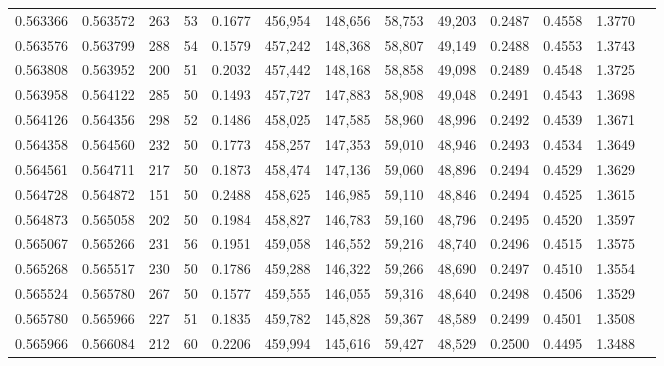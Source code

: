 \begin{tabular}{rrrrrrrrrrrrr}
0.563366 & 0.563572 &   263 &  53 &                                     0.1677 & 456,954 & 148,656 &  58,753 &  49,203 & 0.2487 & 0.4558 & 1.3770 \\
0.563576 & 0.563799 &   288 &  54 &                                     0.1579 & 457,242 & 148,368 &  58,807 &  49,149 & 0.2488 & 0.4553 & 1.3743 \\
0.563808 & 0.563952 &   200 &  51 &                                     0.2032 & 457,442 & 148,168 &  58,858 &  49,098 & 0.2489 & 0.4548 & 1.3725 \\
0.563958 & 0.564122 &   285 &  50 &                                     0.1493 & 457,727 & 147,883 &  58,908 &  49,048 & 0.2491 & 0.4543 & 1.3698 \\
0.564126 & 0.564356 &   298 &  52 &                                     0.1486 & 458,025 & 147,585 &  58,960 &  48,996 & 0.2492 & 0.4539 & 1.3671 \\
0.564358 & 0.564560 &   232 &  50 &                                     0.1773 & 458,257 & 147,353 &  59,010 &  48,946 & 0.2493 & 0.4534 & 1.3649 \\
0.564561 & 0.564711 &   217 &  50 &                                     0.1873 & 458,474 & 147,136 &  59,060 &  48,896 & 0.2494 & 0.4529 & 1.3629 \\
0.564728 & 0.564872 &   151 &  50 &                                     0.2488 & 458,625 & 146,985 &  59,110 &  48,846 & 0.2494 & 0.4525 & 1.3615 \\
0.564873 & 0.565058 &   202 &  50 &                                     0.1984 & 458,827 & 146,783 &  59,160 &  48,796 & 0.2495 & 0.4520 & 1.3597 \\
0.565067 & 0.565266 &   231 &  56 &                                     0.1951 & 459,058 & 146,552 &  59,216 &  48,740 & 0.2496 & 0.4515 & 1.3575 \\
0.565268 & 0.565517 &   230 &  50 &                                     0.1786 & 459,288 & 146,322 &  59,266 &  48,690 & 0.2497 & 0.4510 & 1.3554 \\
0.565524 & 0.565780 &   267 &  50 &                                     0.1577 & 459,555 & 146,055 &  59,316 &  48,640 & 0.2498 & 0.4506 & 1.3529 \\
0.565780 & 0.565966 &   227 &  51 &                                     0.1835 & 459,782 & 145,828 &  59,367 &  48,589 & 0.2499 & 0.4501 & 1.3508 \\
0.565966 & 0.566084 &   212 &  60 &                                     0.2206 & 459,994 & 145,616 &  59,427 &  48,529 & 0.2500 & 0.4495 & 1.3488 \\

\end{tabular}
